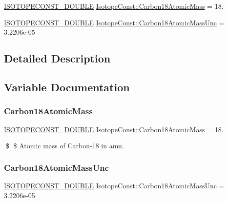 \begin{DoxyCompactItemize}
\item 
\mbox{\hyperlink{group___isotope_const-_macros_ga8f45a7272ce02c0b4c65c44636ed719a}{I\+S\+O\+T\+O\+P\+E\+C\+O\+N\+S\+T\+\_\+\+D\+O\+U\+B\+LE}} \mbox{\hyperlink{group___isotope_const-_carbon-_c18_ga845fcb1b842bb8174100f509544de956}{Isotope\+Const\+::\+Carbon18\+Atomic\+Mass}} = 18.
\item 
\mbox{\hyperlink{group___isotope_const-_macros_ga8f45a7272ce02c0b4c65c44636ed719a}{I\+S\+O\+T\+O\+P\+E\+C\+O\+N\+S\+T\+\_\+\+D\+O\+U\+B\+LE}} \mbox{\hyperlink{group___isotope_const-_carbon-_c18_gaa79e7598489b561f1961c0e3f90b365d}{Isotope\+Const\+::\+Carbon18\+Atomic\+Mass\+Unc}} = 3.\+2206e-\/05
\end{DoxyCompactItemize}


\subsection{Detailed Description}


\subsection{Variable Documentation}
\mbox{\label{group___isotope_const-_carbon-_c18_ga845fcb1b842bb8174100f509544de956}} 
\subsubsection{\texorpdfstring{Carbon18\+Atomic\+Mass}{Carbon18AtomicMass}}
{\footnotesize\ttfamily \mbox{\hyperlink{group___isotope_const-_macros_ga8f45a7272ce02c0b4c65c44636ed719a}{I\+S\+O\+T\+O\+P\+E\+C\+O\+N\+S\+T\+\_\+\+D\+O\+U\+B\+LE}} Isotope\+Const\+::\+Carbon18\+Atomic\+Mass = 18.}

\$ \$ Atomic mass of Carbon-\/18 in amu. \mbox{\label{group___isotope_const-_carbon-_c18_gaa79e7598489b561f1961c0e3f90b365d}} 
\subsubsection{\texorpdfstring{Carbon18\+Atomic\+Mass\+Unc}{Carbon18AtomicMassUnc}}
{\footnotesize\ttfamily \mbox{\hyperlink{group___isotope_const-_macros_ga8f45a7272ce02c0b4c65c44636ed719a}{I\+S\+O\+T\+O\+P\+E\+C\+O\+N\+S\+T\+\_\+\+D\+O\+U\+B\+LE}} Isotope\+Const\+::\+Carbon18\+Atomic\+Mass\+Unc = 3.\+2206e-\/05}


